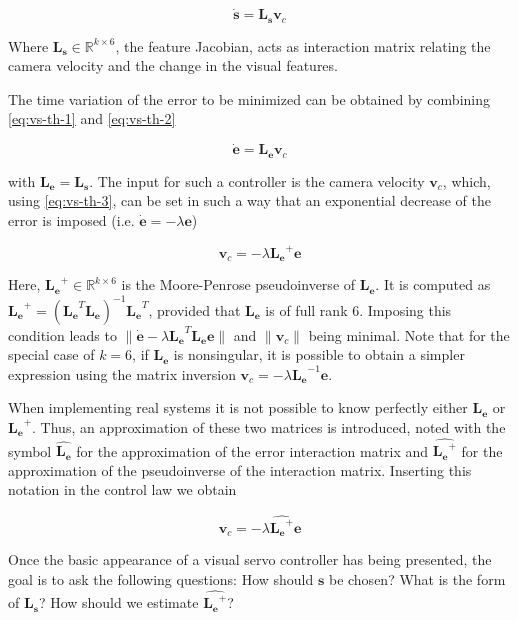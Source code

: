 \begin{equation}
\dot{\bm{s}} = \bm{L_s} \bm{v}_c
\label{eq:vs-th-2}
\end{equation}

Where $\bm{L_s} \in \mathbb{R}^{k \times 6}$, the feature Jacobian, acts as interaction matrix relating the camera velocity and the change in the visual features.

The time variation of the error to be minimized can be obtained by combining \ref{eq:vs-th-1} and \ref{eq:vs-th-2}

\begin{equation}
\dot{\bm{e}} = \bm{L_e} \bm{v}_c
\label{eq:vs-th-3}
\end{equation}

with $\bm{L_e} = \bm{L_s}$. The input for such a controller is the camera velocity  $\bm{v}_c$, which, using \ref{eq:vs-th-3}, can be set in such a way that an exponential decrease of the error is imposed (i.e. $\dot{\bm{e}} = - \lambda \bm{e}$) 

\begin{equation}
\bm{v}_c = - \lambda \bm{L_e}^+ \bm{e}
\label{eq:vs-th-4}
\end{equation}

Here, $\bm{L_e}^+ \in \mathbb{R}^{k \times 6}$ is the Moore-Penrose pseudoinverse of $\bm{L_e}$. It is computed as $\bm{L_e}^+ = (\bm{L_e}^T \bm{L_e})^{-1} \bm{L_e}^T$, provided that $\bm{L_e}$ is of full rank 6. Imposing this condition leads to $\| \dot{\bm{e}} - \lambda \bm{L_e}^T \bm{L_e} \bm{e} \|$ and $\| \bm{v}_c \|$ being minimal. Note that for the special case of $k=6$, if $\bm{L_e}$ is nonsingular, it is possible to obtain a simpler expression using the matrix inversion $\bm{v}_c = - \lambda \bm{L_e}^{-1} \bm{e}$.

When implementing real systems it is not possible to know perfectly either $\bm{L_e}$ or $\bm{L_e}^{+}$. Thus, an approximation of these two matrices is introduced, noted with the symbol $\widehat{\bm{L_e}}$ for the approximation of the error interaction matrix and $\widehat{\bm{L_e}^+}$ for the approximation of the pseudoinverse of the interaction matrix. Inserting this notation in the control law we obtain

\begin{equation}
\bm{v}_c = - \lambda \widehat{\bm{L_e}^+} \bm{e}
\label{eq:vs-th-5}
\end{equation}

Once the basic appearance of a visual servo controller has being presented, the goal is to ask the following questions: How should $\bm{s}$ be chosen?  What is the form of $\bm{L_s}$? How should we estimate $\widehat{\bm{L_e}^+}$?


